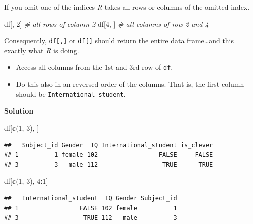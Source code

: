 \documentclass[
]{scrartcl}
\makeatletter
\newenvironment{Shaded}{\begin{snugshade}}{\end{snugshade}}
\newcommand{\CommentTok}[1]{\textcolor[rgb]{0.56,0.35,0.01}{\textit{#1}}}
\newcommand{\DecValTok}[1]{\textcolor[rgb]{0.00,0.00,0.81}{#1}}
\newcommand{\FunctionTok}[1]{\textcolor[rgb]{0.13,0.29,0.53}{\textbf{#1}}}
\newcommand{\NormalTok}[1]{#1}
\newcommand{\SpecialCharTok}[1]{\textcolor[rgb]{0.81,0.36,0.00}{\textbf{#1}}}
\providecommand{\tightlist}{%
  \setlength{\itemsep}{0pt}\setlength{\parskip}{0pt}}
\newenvironment{kframe}{%
\medskip{}
\setlength{\fboxsep}{.8em}
 \def\at@end@of@kframe{}%
 \ifinner\ifhmode%
  \def\at@end@of@kframe{\end{minipage}}%
  \begin{minipage}{\columnwidth}%
 \fi\fi%
 \def\FrameCommand##1{\hskip\@totalleftmargin \hskip-\fboxsep
 \colorbox{shadecolor}{##1}\hskip-\fboxsep
     \hskip-\linewidth \hskip-\@totalleftmargin \hskip\columnwidth}%
 \MakeFramed {\advance\hsize-\width
   \@totalleftmargin\z@ \linewidth\hsize
   \@setminipage}}%
 {\par\unskip\endMakeFramed%
 \at@end@of@kframe}
\newenvironment{rmdblock}[1]
  {
  \begin{itemize}
  \renewcommand{\labelitemi}{
    \raisebox{-.7\height}[0pt][0pt]{
      {\setkeys{Gin}{width=3em,keepaspectratio}\texttt{[image: images/\#1]}}
    }
  }
  \setlength{\fboxsep}{1em}
  \begin{kframe}
  \item
  }
  {
  \end{kframe}
  \end{itemize}
  }
\newenvironment{myexercise}
    {\begin{rmdblock}{exercise_green}}
    {\end{rmdblock}}
\newenvironment{webexsolution}[1]
    {\par\tiny\textbf{#1}}
    {\par}
\newcommand{\webexhide}[1]{\begin{webexsolution}{#1}}
\makeatother
\begin{document}
If you omit one of the indices \emph{R} takes all rows or columns of the omitted index.

\begin{Shaded}
\begin{Highlighting}[]
\NormalTok{df[, }\DecValTok{2}\NormalTok{]    }\CommentTok{\# all rows of column 2}
\NormalTok{df[}\DecValTok{4}\NormalTok{, ]    }\CommentTok{\# all columns of row 2 and 4}
\end{Highlighting}
\end{Shaded}

Consequently, \texttt{df{[},{]}} or \texttt{df{[}{]}} should return the entire data frame\ldots and this exactly what \emph{R} is doing.

\begin{myexercise}
\begin{itemize}
\tightlist
\item
  Access all columns from the 1st and 3rd row of \texttt{df}.
\item
  Do this also in an reversed order of the columns. That is, the first
  column should be \texttt{International\_student}.
\end{itemize}
\end{myexercise}
\webexhide{Solution}

\begin{Shaded}
\begin{Highlighting}[]
\NormalTok{df[}\FunctionTok{c}\NormalTok{(}\DecValTok{1}\NormalTok{, }\DecValTok{3}\NormalTok{), ]}
\end{Highlighting}
\end{Shaded}

\begin{verbatim}
##   Subject_id Gender  IQ International_student is_clever
## 1          1 female 102                 FALSE     FALSE
## 3          3   male 112                  TRUE      TRUE
\end{verbatim}

\begin{Shaded}
\begin{Highlighting}[]
\NormalTok{df[}\FunctionTok{c}\NormalTok{(}\DecValTok{1}\NormalTok{, }\DecValTok{3}\NormalTok{), }\DecValTok{4}\SpecialCharTok{:}\DecValTok{1}\NormalTok{]}
\end{Highlighting}
\end{Shaded}

\begin{verbatim}
##   International_student  IQ Gender Subject_id
## 1                 FALSE 102 female          1
## 3                  TRUE 112   male          3
\end{verbatim}
\end{document}

